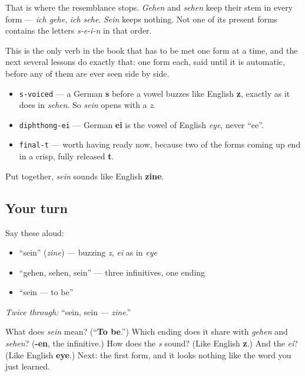 That is where the resemblance stops. \emph{Gehen} and \emph{sehen} keep their stem in every form — \emph{ich gehe}, \emph{ich sehe}. \emph{Sein} keeps nothing. Not one of its present forms contains the letters \emph{s-e-i-n} in that order.

This is the only verb in the book that has to be met one form at a time, and the next several lessons do exactly that: one form each, said until it is automatic, before any of them are ever seen side by side.

\begin{sounds}
\begin{itemize}
\raggedright
  \item \texttt{s-voiced} — a German \textbf{s} before a vowel buzzes like English \textbf{z}, exactly as it does in \emph{sehen}. So \emph{sein} opens with a \emph{z}.
  \item \texttt{diphthong-ei} — German \textbf{ei} is the vowel of English \emph{eye}, never \textquotedblleft{}ee\textquotedblright{}.
  \item \texttt{final-t} — worth having ready now, because two of the forms coming up end in a crisp, fully released \textbf{t}.
\end{itemize}

Put together, \emph{sein} sounds like English \textbf{zine}.
\end{sounds}

\subsection*{Your turn}
Say these aloud:

\begin{itemize}
\raggedright
  \item \textquotedblleft{}sein\textquotedblright{} (\emph{zine}) — buzzing \emph{z}, \emph{ei} as in \emph{eye}
  \item \textquotedblleft{}gehen, sehen, sein\textquotedblright{} — three infinitives, one ending
  \item \textquotedblleft{}sein — to be\textquotedblright{}
\end{itemize}

\emph{Twice through:} \textquotedblleft{}sein, sein — \emph{zine}.\textquotedblright{}

\begin{tcolorbox}[breakable,colback=teal!4,colframe=teal!35!black,title={Before you move on}]
What does \emph{sein} mean? (\textquotedblleft{}\textbf{To be}.\textquotedblright{}) Which ending does it share with \emph{gehen} and \emph{sehen}? (\textbf{-en}, the infinitive.) How does the \emph{s} sound? (Like English \textbf{z}.) And the \emph{ei}? (Like English \textbf{eye}.) Next: the first form, and it looks nothing like the word you just learned.
\end{tcolorbox}
